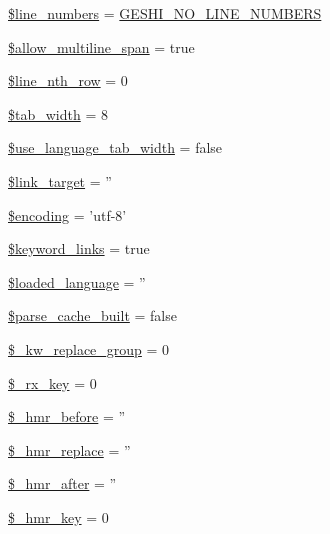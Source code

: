 \begin{DoxyCompactItemize}
\item 
\hyperlink{class_ge_s_hi_a4cb044f6b765a6749817761a8597b9e7}{\$line\-\_\-numbers} = \hyperlink{geshi_8php_a1fe21885ebfc0b528b68b49fe6ab3733}{G\-E\-S\-H\-I\-\_\-\-N\-O\-\_\-\-L\-I\-N\-E\-\_\-\-N\-U\-M\-B\-E\-R\-S}
\item 
\hyperlink{class_ge_s_hi_a82ab423fe47e494e1f4c2983a5fb78bd}{\$allow\-\_\-multiline\-\_\-span} = true
\item 
\hyperlink{class_ge_s_hi_a87b747beb648bba71458a213f65b912e}{\$line\-\_\-nth\-\_\-row} = 0
\item 
\hyperlink{class_ge_s_hi_ab5f2488b968d378bdaee6127e7284a65}{\$tab\-\_\-width} = 8
\item 
\hyperlink{class_ge_s_hi_af0d15829de4298f614700c1e25dadc42}{\$use\-\_\-language\-\_\-tab\-\_\-width} = false
\item 
\hyperlink{class_ge_s_hi_a0c8794649f21000514d6e13929138ca3}{\$link\-\_\-target} = ''
\item 
\hyperlink{class_ge_s_hi_a3b03e6a3b66127948eaa2a5d42889d69}{\$encoding} = 'utf-\/8'
\item 
\hyperlink{class_ge_s_hi_acebed51fe215de45f23093f55e8a627a}{\$keyword\-\_\-links} = true
\item 
\hyperlink{class_ge_s_hi_a3a21055076162213a2bea8e03e92fa28}{\$loaded\-\_\-language} = ''
\item 
\hyperlink{class_ge_s_hi_a74af0146a69db0a551368b25b6496a93}{\$parse\-\_\-cache\-\_\-built} = false
\item 
\hyperlink{class_ge_s_hi_a7b878506cd9e3be76fc7d5f417ea8c6a}{\$\-\_\-kw\-\_\-replace\-\_\-group} = 0
\item 
\hyperlink{class_ge_s_hi_a611e34117b54a25d834a60ee18c30e28}{\$\-\_\-rx\-\_\-key} = 0
\item 
\hyperlink{class_ge_s_hi_abd0763692940f0614fed05dd63a16281}{\$\-\_\-hmr\-\_\-before} = ''
\item 
\hyperlink{class_ge_s_hi_a2972dfac53d1fdfe259d535f9365630c}{\$\-\_\-hmr\-\_\-replace} = ''
\item 
\hyperlink{class_ge_s_hi_a3cf085626e1a4170d8e5a0d2ee8052c7}{\$\-\_\-hmr\-\_\-after} = ''
\item 
\hyperlink{class_ge_s_hi_a4768ed269c10f5ed9838cb34730fd315}{\$\-\_\-hmr\-\_\-key} = 0
\end{DoxyCompactItemize}



